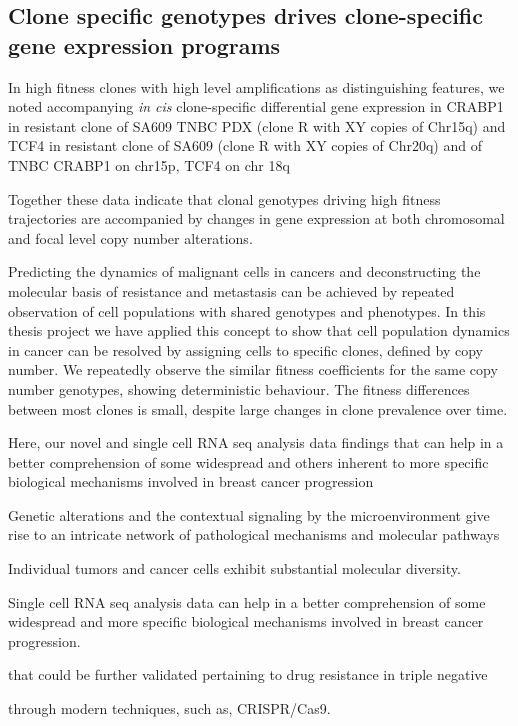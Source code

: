 \subsection{Clone specific genotypes drives clone-specific gene expression programs}




In high fitness clones with high level amplifications as distinguishing features, we noted accompanying \textit{in cis} clone-specific differential gene expression in CRABP1 in resistant clone of SA609 TNBC PDX (clone R with XY copies of Chr15q) and  TCF4 in resistant clone of SA609 (clone R with XY copies of Chr20q) and of TNBC
CRABP1 on chr15p, TCF4 on chr 18q 






Together these data indicate that clonal genotypes driving high fitness trajectories are accompanied by changes in gene expression at both chromosomal and focal level copy number alterations.







Predicting the dynamics of malignant cells in cancers and deconstructing the molecular basis of resistance and metastasis can be achieved by repeated observation of cell populations with shared genotypes and phenotypes. In this thesis project we have applied this concept to show that cell population dynamics in cancer can be resolved by assigning cells to specific clones, defined by copy number. We repeatedly observe the similar fitness coefficients for the same copy number genotypes, showing deterministic behaviour. The fitness differences between most clones is small, despite large changes in clone prevalence over time.

Here, our novel  and single cell RNA seq analysis data findings that can help in a better comprehension of some widespread and others inherent to more specific biological mechanisms involved in breast cancer progression 


Genetic alterations and the contextual signaling by the microenvironment give rise to an intricate network of pathological mechanisms and molecular pathways


Individual tumors and cancer cells exhibit substantial molecular diversity.

Single cell RNA seq analysis data can help in a better comprehension of some widespread and more specific biological mechanisms involved in breast cancer progression.




that could be further validated pertaining to drug resistance in triple negative 

through modern techniques, such as, CRISPR/Cas9.